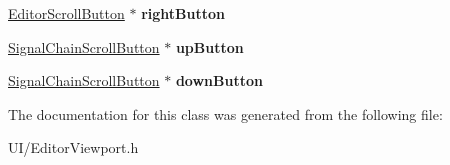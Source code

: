 \begin{DoxyCompactItemize}
\item 
\hypertarget{classEditorViewport_a0683397c25ec6c4193322cb44b317d10}{\hyperlink{classEditorScrollButton}{Editor\-Scroll\-Button} $\ast$ {\bfseries right\-Button}}\label{classEditorViewport_a0683397c25ec6c4193322cb44b317d10}

\item 
\hypertarget{classEditorViewport_aca0a1943bce0ec9b5950b6c395df2094}{\hyperlink{classSignalChainScrollButton}{Signal\-Chain\-Scroll\-Button} $\ast$ {\bfseries up\-Button}}\label{classEditorViewport_aca0a1943bce0ec9b5950b6c395df2094}

\item 
\hypertarget{classEditorViewport_a0749ed016653202a8bed9447b45de1b6}{\hyperlink{classSignalChainScrollButton}{Signal\-Chain\-Scroll\-Button} $\ast$ {\bfseries down\-Button}}\label{classEditorViewport_a0749ed016653202a8bed9447b45de1b6}

\end{DoxyCompactItemize}


The documentation for this class was generated from the following file\-:\begin{DoxyCompactItemize}
\item 
U\-I/Editor\-Viewport.\-h\end{DoxyCompactItemize}

